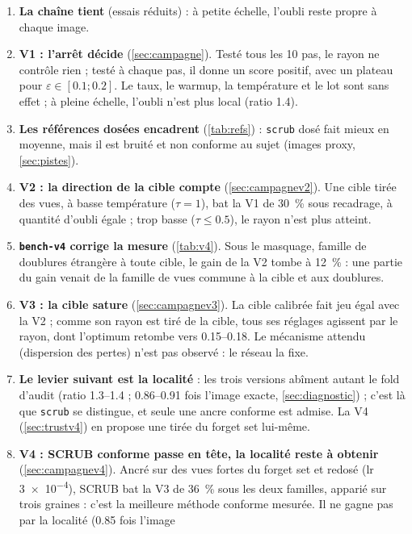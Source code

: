 \documentclass[11pt,a4paper]{article}
\newcommand{\code}[1]{\texttt{#1}}
\begin{document}
\begin{enumerate}[leftmargin=1.6em,itemsep=2pt]
  \item \textbf{La chaîne tient} (essais réduits) : à petite échelle, l'oubli reste propre à chaque
    image.
  \item \textbf{V1 : l'arrêt décide} (\cref{sec:campagne}). Testé tous les 10 pas, le rayon ne
    contrôle rien ; testé à chaque pas, il donne un score positif, avec un plateau pour
    $\varepsilon\in[\num{0.1};\num{0.2}]$. Le taux, le warmup, la température et le lot sont sans
    effet ; à pleine échelle, l'oubli n'est plus local (ratio \num{1.4}).
  \item \textbf{Les références dosées encadrent} (\cref{tab:refs}) : \code{scrub} dosé fait mieux
    en moyenne, mais il est bruité et non conforme au sujet (images proxy, \cref{sec:pistes}).
  \item \textbf{V2 : la direction de la cible compte} (\cref{sec:campagnev2}). Une cible tirée des
    vues, à basse température ($\tau=1$), bat la V1 de \SI{30}{\percent} sous recadrage, à quantité
    d'oubli égale ; trop basse ($\tau\le\num{0.5}$), le rayon n'est plus atteint.
  \item \textbf{\code{bench-v4} corrige la mesure} (\cref{tab:v4}). Sous le masquage, famille de
    doublures étrangère à toute cible, le gain de la V2 tombe à \SI{12}{\percent} : une partie du gain
    venait de la famille de vues commune à la cible et aux doublures.
  \item \textbf{V3 : la cible sature} (\cref{sec:campagnev3}). La cible calibrée fait jeu égal avec la
    V2 ; comme son rayon est tiré de la cible, tous ses réglages agissent par le rayon, dont
    l'optimum retombe vers \numrange{0.15}{0.18}. Le mécanisme attendu (dispersion des pertes) n'est
    pas observé : le réseau la fixe.
  \item \textbf{Le levier suivant est la localité} : les trois versions abîment
    autant le fold d'audit (ratio \numrange{1.3}{1.4} ; \numrange{0.86}{0.91} fois l'image exacte,
    \cref{sec:diagnostic}) ; c'est là que \code{scrub} se distingue, et seule une ancre conforme est
    admise. La V4 (\cref{sec:trustv4}) en propose une tirée du forget set lui-même.
  \item \textbf{V4 : SCRUB conforme passe en tête, la localité reste à obtenir}
    (\cref{sec:campagnev4}). Ancré sur des vues fortes du forget set et redosé (lr \num{3e-4}),
    SCRUB bat la V3 de \SI{36}{\percent} sous les deux familles, apparié sur trois graines : c'est la
    meilleure méthode conforme mesurée. Il ne gagne pas par la localité (\num{0.85} fois l'image

\end{enumerate}
\end{document}
